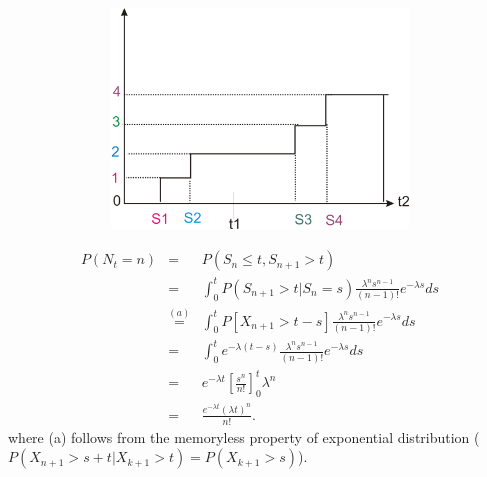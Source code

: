\documentclass[11 pt]{article}
\theoremstyle{plain}
\theoremstyle{definition}
\theoremstyle{remark}
\begin{document}
\vspace{-0.2cm}
\begin{figure}[h!t]
\center
  \includegraphics[width=5in, height=2.3in]{notes1.png}\\
\end{figure}
\vspace{-0.5cm}
\begin{eqnarray*}
   P(N_{t} =n)&=&  P(S_{n}\leq t, S_{n+1} >t)\\
   &=&  \int^{t}_{0} P\left( {S_{n+1}>t}|{S_{n}=s}\right)\frac{\lambda^{n}s^{n-1}}{(n-1)!}e^{-\lambda s}  ds\\
   &\stackrel{(a)}{=}& \int^{t}_{0} P[X_{n+1}>t-s] \frac{\lambda^{n}s^{n-1}}{(n-1)!}e^{-\lambda s}  ds\\
   &=&  \int^{t}_{0}e^{-\lambda(t- s)} \frac{\lambda^{n}s^{n-1}}{(n-1)!}e^{-\lambda s}  ds\\
   &=& e^{-\lambda t}\left[ \frac{s^{n}}{n !} \right]^{t}_{0} \lambda^{n}\\
  &=&\frac{e^{-\lambda t} (\lambda t)^{n}}{n !}.
   \end{eqnarray*}
 where (a) follows from the memoryless property of exponential distribution ($P(X_{n+1}>s+t|X_{k+1}>t)=P(X_{k+1}>s)$).\\
   
     \hspace{90pt} \\
       
\end{document}
